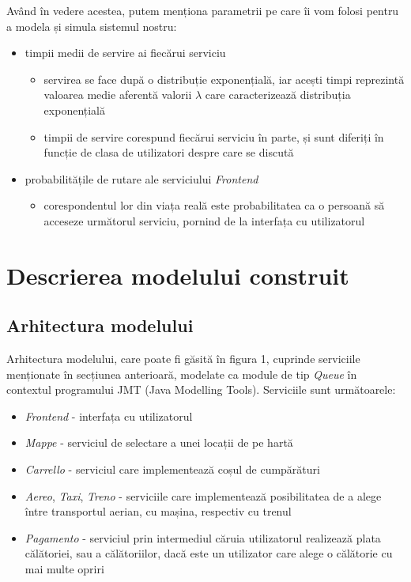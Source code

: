 \documentclass[12pt]{article}
\begin{document}
            Având în vedere acestea, putem menționa parametrii pe care îi vom folosi pentru a modela și simula sistemul nostru:
            \begin{itemize}
                \item{timpii medii de servire ai fiecărui serviciu}
                    \begin{itemize}
                        \item{servirea se face după o distribuție exponențială, iar acești timpi reprezintă valoarea medie aferentă valorii $\lambda$ care caracterizează distribuția exponențială}
                        \item{timpii de servire corespund fiecărui serviciu în parte, și sunt diferiți în funcție de clasa de utilizatori despre care se discută}
                    \end{itemize}
                \item{probabilitățile de rutare ale serviciului \textit{Frontend}}
                    \begin{itemize}
                        \item{corespondentul lor din viața reală este probabilitatea ca o persoană să acceseze următorul serviciu, pornind de la interfața cu utilizatorul}
                    \end{itemize}
            \end{itemize}
            \pagebreak


    \section{Descrierea modelului construit}

        \subsection{Arhitectura modelului}
            Arhitectura modelului, care poate fi găsită în figura 1, cuprinde serviciile menționate în secțiunea anterioară, modelate ca module de tip \textit{Queue} în contextul programului JMT (Java Modelling Tools). Serviciile sunt următoarele:

            \begin{itemize}
                \itemsep0em
                \item{\textit{Frontend} - interfața cu utilizatorul}
                \item{\textit{Mappe} - serviciul de selectare a unei locații de pe hartă}
                \item{\textit{Carrello} - serviciul care implementează coșul de cumpărături}
                \item{\textit{Aereo}, \textit{Taxi}, \textit{Treno} - serviciile care implementează posibilitatea de a alege între transportul aerian, cu mașina, respectiv cu trenul}
                \item{\textit{Pagamento} - serviciul prin intermediul căruia utilizatorul realizează plata călătoriei, sau a călătoriilor, dacă este un utilizator care alege o călătorie cu mai multe opriri}
            \end{itemize}
\end{document}
